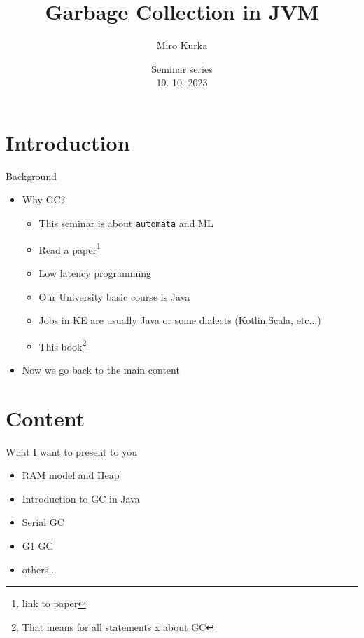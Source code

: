 \documentclass[10pt, xcolor=x11names,compress]{beamer}
\author{Miro Kurka}
\title{Garbage Collection in JVM}
\institute{Pavol Jozef Safarik University}\date{Seminar series \\ 19. 10. 2023}
\begin{document}
 \begin{frame}
 \titlepage
 \end{frame}

\section{Introduction}
\begin{frame}[label=Background]{Background}
\begin{itemize}
\item Why GC?\\
   \begin{itemize}
    \item This seminar is about \texttt{automata} and ML 
    \item Read a paper\footnote{link to paper}\
    \item Low latency programming
    \item Our University basic course is Java 
    \item Jobs in KE are usually Java or some dialects (Kotlin,Scala, etc...)
    \item This book\footnote{That means for all statements x about GC }
   \end{itemize}
\item Now we go back to the main content\\

\end{itemize}
\end{frame}

\section{Content}
\begin{frame}{What I want to present to you}
\begin{itemize}
    \item RAM model and Heap
    \item Introduction to GC in Java 
    \item Serial GC 
    \item G1 GC 
    \item others...
\end{itemize}
\end{frame}
\end{document}

